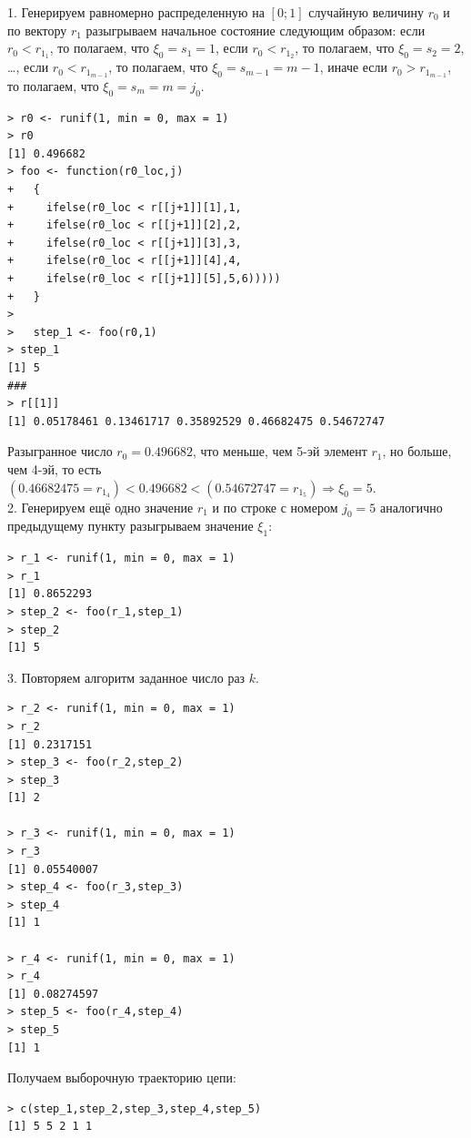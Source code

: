 \documentclass[14pt,a4paper]{scrartcl}
\begin{document}
1. Генерируем равномерно распределенную на $[0;1]$ случайную величину $r_0$ и по вектору $r_1$ разыгрываем начальное состояние следующим образом: если $r_0 < r_{1_1}$, то полагаем, что $\xi_0 = s_1 = 1$, если $r_0 < r_{1_2}$, то полагаем, что $\xi_0 = s_2 = 2$, \ldots, если $r_0 < r_{1_{m-1}}$, то полагаем, что $\xi_0 = s_{m-1} = m-1$, иначе если $r_0 > r_{1_{m-1}}$, то полагаем, что $\xi_0 = s_{m} = m = j_0$.


\begin{verbatim}
> r0 <- runif(1, min = 0, max = 1)
> r0
[1] 0.496682
> foo <- function(r0_loc,j)
+   {
+     ifelse(r0_loc < r[[j+1]][1],1,
+     ifelse(r0_loc < r[[j+1]][2],2,
+     ifelse(r0_loc < r[[j+1]][3],3,
+     ifelse(r0_loc < r[[j+1]][4],4,
+     ifelse(r0_loc < r[[j+1]][5],5,6)))))
+   }
>   
>   step_1 <- foo(r0,1)
> step_1
[1] 5
###
> r[[1]]
[1] 0.05178461 0.13461717 0.35892529 0.46682475 0.54672747
\end{verbatim}

Разыгранное число $r_0 = 0.496682$, что меньше, чем 5-эй элемент $r_1$, но больше, чем 4-эй, то есть $(0.46682475 = r_{1_4})< 0.496682 < (0.54672747 = r_{1_5})  \Rightarrow \xi_0 = 5$. \\

2. Генерируем ещё одно значение $r_1$ и по строке с номером $j_0 = 5$ аналогично предыдущему пункту разыгрываем значение $\xi_1:$

\begin{verbatim}
> r_1 <- runif(1, min = 0, max = 1)
> r_1
[1] 0.8652293
> step_2 <- foo(r_1,step_1)
> step_2
[1] 5
\end{verbatim}

3. Повторяем алгоритм  заданное число раз $k$.

\begin{verbatim}
> r_2 <- runif(1, min = 0, max = 1)
> r_2
[1] 0.2317151
> step_3 <- foo(r_2,step_2)
> step_3
[1] 2

> r_3 <- runif(1, min = 0, max = 1)
> r_3
[1] 0.05540007
> step_4 <- foo(r_3,step_3)
> step_4
[1] 1

> r_4 <- runif(1, min = 0, max = 1)
> r_4
[1] 0.08274597
> step_5 <- foo(r_4,step_4)
> step_5
[1] 1
\end{verbatim}

Получаем выборочную траекторию цепи:

\begin{verbatim}
> c(step_1,step_2,step_3,step_4,step_5)
[1] 5 5 2 1 1
\end{verbatim}
	
\end{document}

